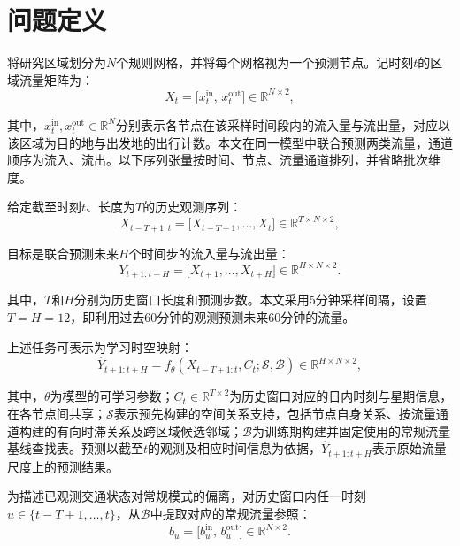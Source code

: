 
\section{问题定义}\label{sec:problem-definition}

将研究区域划分为\(N\)个规则网格，并将每个网格视为一个预测节点。记时刻\(t\)的区域流量矩阵为：
\begin{equation}
\label{eq:flow}
X_t = \bigl[x_t^{\mathrm{in}},\,x_t^{\mathrm{out}}\bigr]
\in \mathbb{R}^{N\times 2},
\end{equation}

其中，\(x_t^{\mathrm{in}},x_t^{\mathrm{out}}\in\mathbb{R}^{N}\)分别表示各节点在该采样时间段内的流入量与流出量，对应以该区域为目的地与出发地的出行计数。本文在同一模型中联合预测两类流量，通道顺序为流入、流出。以下序列张量按时间、节点、流量通道排列，并省略批次维度。

给定截至时刻\(t\)、长度为\(T\)的历史观测序列：
\begin{equation}
\label{eq:history}
X_{t-T+1:t} = \bigl[X_{t-T+1},\ldots,X_t\bigr]
\in \mathbb{R}^{T\times N\times 2},
\end{equation}

目标是联合预测未来\(H\)个时间步的流入量与流出量：
\begin{equation}
\label{eq:future}
Y_{t+1:t+H} = \bigl[X_{t+1},\ldots,X_{t+H}\bigr]
\in \mathbb{R}^{H\times N\times 2}.
\end{equation}

其中，\(T\)和\(H\)分别为历史窗口长度和预测步数。本文采用5分钟采样间隔，设置\(T=H=12\)，即利用过去60分钟的观测预测未来60分钟的流量。

上述任务可表示为学习时空映射：
\begin{equation}
\label{eq:mapping}
\widehat{Y}_{t+1:t+H}
= f_{\theta}\!\left(X_{t-T+1:t},C_t;\mathcal{S},\mathcal{B}\right)
\in \mathbb{R}^{H\times N\times 2},
\end{equation}

其中，\(\theta\)为模型的可学习参数；\(C_t\in\mathbb{R}^{T\times 2}\)为历史窗口对应的日内时刻与星期信息，在各节点间共享；\(\mathcal{S}\)表示预先构建的空间关系支持，包括节点自身关系、按流量通道构建的有向时滞关系及跨区域候选邻域；\(\mathcal{B}\)为训练期构建并固定使用的常规流量基线查找表。预测以截至\(t\)的观测及相应时间信息为依据，\(\widehat{Y}_{t+1:t+H}\)表示原始流量尺度上的预测结果。

为描述已观测交通状态对常规模式的偏离，对历史窗口内任一时刻\(u\in\{t-T+1,\ldots,t\}\)，从\(\mathcal{B}\)中提取对应的常规流量参照：
\begin{equation}
\label{eq:baseline}
b_u=\bigl[b_u^{\mathrm{in}},\,b_u^{\mathrm{out}}\bigr]
\in\mathbb{R}^{N\times 2}.
\end{equation}

